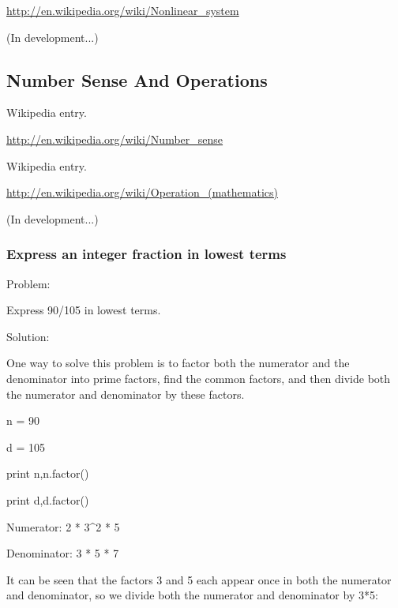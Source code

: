 \documentclass[12pt,twoside]{book}
\begin{document}
\href{http://en.wikipedia.org/wiki/Nonlinear_system}{http://en.wikipedia.org/wiki/Nonlinear\_system}

(In development...)

\subsection[Number Sense And Operations]{Number Sense
And Operations}
Wikipedia entry.

\href{http://en.wikipedia.org/wiki/Number_sense}{http://en.wikipedia.org/wiki/Number\_sense}

Wikipedia entry.

\href{http://en.wikipedia.org/wiki/Operation_(mathematics)}{http://en.wikipedia.org/wiki/Operation\_(mathematics)}

(In development...)

\subsubsection[Express an integer fraction in lowest
terms]{Express an integer fraction in lowest terms}
{\textquotedbl}{\textquotedbl}{\textquotedbl}

Problem:

Express 90/105 in lowest terms.


\bigskip

Solution:

One way to solve this problem is to factor both the numerator and the
denominator into prime factors, find the common factors, and then
divide both the numerator and denominator by these factors.

{\textquotedbl}{\textquotedbl}{\textquotedbl}

n = 90

d = 105

print n,n.factor()

print d,d.factor()

{\textbar}

Numerator: 2 * 3\^{}2 * 5

Denominator: 3 * 5 * 7


\bigskip

{\textquotedbl}{\textquotedbl}{\textquotedbl}

It can be seen that the factors 3 and 5 each appear once in both the
numerator and denominator, so we divide both the numerator and
denominator by 3*5:

{\textquotedbl}{\textquotedbl}{\textquotedbl}
\end{document}
